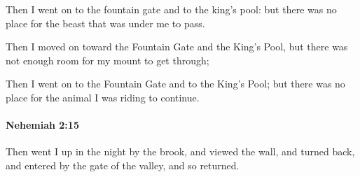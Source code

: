 			\begin{versebox}
					\item[BHS] 
					\item[LXX] 
					\item[ASV] Then I went on to the fountain gate and to the king's pool: but there was no place for the beast that was under me to pass.
					\item[NIV] Then I moved on toward the Fountain Gate and the King’s Pool, but there was not enough room for my mount to get through;
					\item[NRSV] Then I went on to the Fountain Gate and to the King’s Pool; but there was no place for the animal I was riding to continue.
			\end{versebox}

		\paragraph{Nehemiah 2:15} %
			\label{NEHEMIAH-2-15}

			Then went I up in the night by the brook, and viewed the wall, and turned back, and entered by the gate of the valley, and so returned.

